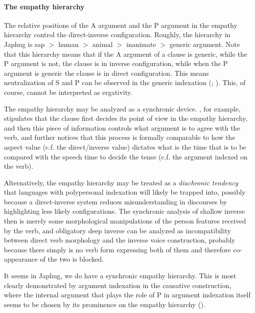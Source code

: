 \documentclass[a4paper, oneside, 12pt]{report}
\newcommand*{\textgt}{$>$ }
\newcommand*{\citesec}[1]{\S~{#1}}
\begin{document}
\paragraph*{The empathy hierarchy}\label{sec:grammatical.clause.direct-inverse.hierarchy} 
The relative positions of the A argument and the P argument in the empathy hierarchy
control the direct-inverse configuration.
Roughly, the hierarchy in Japhug is 
\ac{sap} \textgt human \textgt animal \textgt inanimate \textgt generic argument.
Note that this hierarchy means that
if the A argument of a clause is generic,
while the P argument is not,
the clause is in inverse configuration,
while when the P argument is generic the clause is in direct configuration.
This means neutralization of S and P can be observed in the generic indexation
(\citealt{jacques2012argument}; \citealt[\citesec{14.3.2.5}]{jacques2021grammar}).
This, of course, cannot be interpreted as ergativity.

The empathy hierarchy may be analyzed as a synchronic device. 
\citet[\citesec{7.4}]{wiltschko2014universal}, for example,
stipulates that the clause first decides its point of view in the empathy hierarchy,
and then this piece of information controls what argument is to agree with the verb,
and further notices that this process is formally comparable to
how the aspect value (c.f. the direct/inverse value) 
dictates what is the time that is to be compared with the speech time to decide the tense
(c.f. the argument indexed on the verb).

Alternatively, the empathy hierarchy may be treated as a \emph{diachronic tendency}
that languages with polypersonal indexation will likely be trapped into,
possibly because a direct-inverse system reduces misunderstanding in discourses
by highlighting less likely configurations.
The synchronic analysis of shallow inverse then is merely 
some morphological manipulations of the person features received by the verb,
and obligatory deep inverse can be analyzed as incompatibility between
direct verb morphology and the inverse voice construction,
probably because there simply is no verb form expressing both of them
and therefore co-appearance of the two is blocked.

It seems in Japhug, we do have a synchronic empathy hierarchy.
This is most clearly demonstrated by argument indexation in the causative construction,
where the internal argument that plays the role of P in argument indexation
itself seems to be chosen by its prominence on the empathy hierarchy
().
\end{document}
